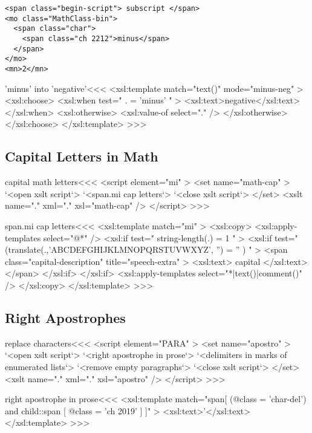 \documentclass{article}
\begin{document}
\begin{verbatim}
<span class="begin-script"> subscript </span>
<mo class="MathClass-bin">
  <span class="char">
    <span class="ch 2212">minus</span>
  </span>
</mo>
<mn>2</mn>
\end{verbatim}




\<'minus' into 'negative'\><<<
<xsl:template match="text()" mode="minus-neg" >
  <xsl:choose>
    <xsl:when test=" . = 'minus' " >
      <xsl:text>negative</xsl:text>
    </xsl:when>
    <xsl:otherwise>
      <xsl:value-of select="." />
    </xsl:otherwise>
  </xsl:choose>
</xsl:template> 
>>>


\subsection{Capital Letters in Math}

\<capital math letters\><<<
<script element="mi" >
  <set name="math-cap" >
     `<open xslt script`>
     `<span.mi cap letters`> 
     `<close xslt script`>
  </set>
  <xslt name="." xml="." xsl="math-cap" />
</script> 
>>>


\<span.mi cap letters\><<<
<xsl:template match="mi" >
  <xsl:copy>
      <xsl:apply-templates select="@*" />
      <xsl:if test=" string-length(.) = 1 " >      
         <xsl:if test="
                     (translate(.,'ABCDEFGHIJKLMNOPQRSTUVWXYZ',
                                  '') = '' )
                  " >      
            <span class="capital-description" 
                  title="speech-extra" >
               <xsl:text> capital </xsl:text>
            </span>
         </xsl:if>      
      </xsl:if>      
      <xsl:apply-templates select="*|text()|comment()" />
  </xsl:copy>
</xsl:template> 
>>>



\subsection{Right Apostrophes}



\<replace characters\><<<
<script element="PARA" >
  <set name="apostro" >
     `<open xslt script`>
     `<right apostrophe in prose`>
     `<delimiters in marks of enumerated lists`>
     `<remove empty paragraphs`>
     `<close xslt script`>
  </set>
  <xslt name="." xml="." xsl="apostro" />
</script> 
>>>


\<right apostrophe in prose\><<<
<xsl:template match="span[
     (@class = 'char-del') 
    and  child::span [ @class = 'ch 2019' ]
]" >
   <xsl:text>'</xsl:text>
</xsl:template> 
>>>
\end{document}
